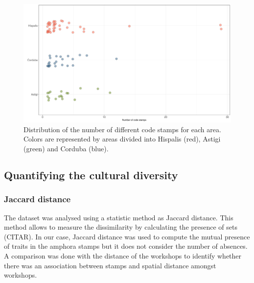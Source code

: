 \documentclass[review]{elsarticle}
\newcommand{\memo}[2]{\textcolor{#1}{#2}}
\newcommand{\xavi}[1]{\memo{magenta}{XRC: #1\\}}
\begin{document}
\begin{figure}[htp]
	\centering
\includegraphics[width=\linewidth]{figs/frequency}
\caption{Distribution of the number of different code stamps for each area. Colors are represented by areas divided into Hispalis (red), Astigi (green) and Corduba (blue).}
\label{frequency}
\end{figure} 






\subsection{Quantifying the cultural diversity}


\subsubsection{Jaccard distance}

The dataset was analysed using a statistic method as Jaccard distance. This method allows to measure the dissimilarity by calculating the presence of sets (CITAR). In our case, Jaccard distance was used to compute the mutual presence of traits in the amphora stamps but it does not consider the number of absences. A comparison was done with the distance of the workshops to identify whether there was an association between stamps and spatial distance amongst workshops. 
\end{document}
